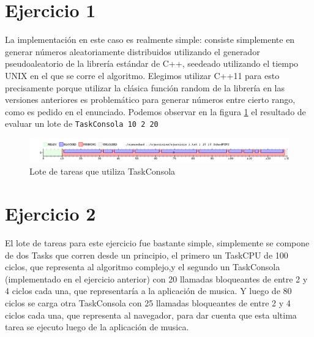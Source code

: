 \documentclass{article}
\begin{document}
{} %

\subtitulo{}
\grupo{}

 
\maketitle

\pagebreak

\tableofcontents

\pagebreak

\section{Ejercicio 1}

La implementación en este caso es realmente simple: consiste simplemente en generar números aleatoriamente distribuidos utilizando el generador pseudoaleatorio de la librería estándar de C++, seedeado utilizando el tiempo UNIX en el que se corre el algoritmo. Elegimos utilizar C++11 para esto precisamente porque utilizar la clásica función random de la librería en las versiones anteriores es problemático para generar números entre cierto rango, como es pedido en el enunciado. Podemos observar en la figura \ref{grf:ex1} el resultado de evaluar un lote de \verb`TaskConsola 10 2 20`

\begin{figure}[h!]
\caption{Lote de tareas que utiliza TaskConsola \label{grf:ex1}}
\centering
\includegraphics[width=15cm]{../ejercicios/ejercicio 1}
\end{figure}

\section{Ejercicio 2}

El lote de tareas para este ejercicio fue bastante simple, simplemente se compone de dos Tasks que corren desde un principio, el primero un TaskCPU de 100 ciclos, que representa al algoritmo complejo,y el segundo un TaskConsola (implementado en el ejercicio anterior) con 20 llamadas bloqueantes de entre 2 y 4 ciclos cada una, que representaría a la aplicación de musica. Y luego de 80 ciclos se carga otra TaskConsola con 25 llamadas bloqueantes de entre 2 y 4 ciclos cada una, que representa al navegador, para dar cuenta que esta ultima tarea se ejecuto luego de la aplicación de musica.
\end{document}
